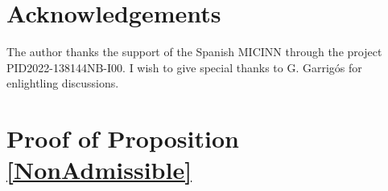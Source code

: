 \documentclass[11pt]{article}
\newtheorem{definition}{Definition}[section]
\begin{document}
% 
% 
% 






%







\section*{Acknowledgements}

The author thanks the support of the Spanish MICINN through the project PID2022-138144NB-I00. I wish to give special thanks to G. Garrig\'os for enlightling discussions.


\appendix



\section{Proof of Proposition \ref{NonAdmissible}}
\label{app:0}
\end{document}
